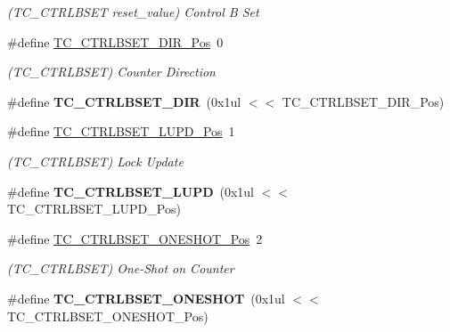 \begin{DoxyCompactItemize}
\begin{DoxyCompactList}\small\item\em (T\+C\+\_\+\+C\+T\+R\+L\+B\+S\+E\+T reset\+\_\+value) Control B Set \end{DoxyCompactList}\item 
\hypertarget{group___s_a_m_l21___t_c_gabf280d5e61422b23b9b6d8c07d33b079}{}\#define \hyperlink{group___s_a_m_l21___t_c_gabf280d5e61422b23b9b6d8c07d33b079}{T\+C\+\_\+\+C\+T\+R\+L\+B\+S\+E\+T\+\_\+\+D\+I\+R\+\_\+\+Pos}~0\label{group___s_a_m_l21___t_c_gabf280d5e61422b23b9b6d8c07d33b079}

\begin{DoxyCompactList}\small\item\em (T\+C\+\_\+\+C\+T\+R\+L\+B\+S\+E\+T) Counter Direction \end{DoxyCompactList}\item 
\hypertarget{group___s_a_m_l21___t_c_ga822478054eab6d1670c826214bc6317f}{}\#define {\bfseries T\+C\+\_\+\+C\+T\+R\+L\+B\+S\+E\+T\+\_\+\+D\+I\+R}~(0x1ul $<$$<$ T\+C\+\_\+\+C\+T\+R\+L\+B\+S\+E\+T\+\_\+\+D\+I\+R\+\_\+\+Pos)\label{group___s_a_m_l21___t_c_ga822478054eab6d1670c826214bc6317f}

\item 
\hypertarget{group___s_a_m_l21___t_c_ga4da73190935115dea69e74197e72aa0b}{}\#define \hyperlink{group___s_a_m_l21___t_c_ga4da73190935115dea69e74197e72aa0b}{T\+C\+\_\+\+C\+T\+R\+L\+B\+S\+E\+T\+\_\+\+L\+U\+P\+D\+\_\+\+Pos}~1\label{group___s_a_m_l21___t_c_ga4da73190935115dea69e74197e72aa0b}

\begin{DoxyCompactList}\small\item\em (T\+C\+\_\+\+C\+T\+R\+L\+B\+S\+E\+T) Lock Update \end{DoxyCompactList}\item 
\hypertarget{group___s_a_m_l21___t_c_gaeba2402a78e94d4354142a8bf8f3551e}{}\#define {\bfseries T\+C\+\_\+\+C\+T\+R\+L\+B\+S\+E\+T\+\_\+\+L\+U\+P\+D}~(0x1ul $<$$<$ T\+C\+\_\+\+C\+T\+R\+L\+B\+S\+E\+T\+\_\+\+L\+U\+P\+D\+\_\+\+Pos)\label{group___s_a_m_l21___t_c_gaeba2402a78e94d4354142a8bf8f3551e}

\item 
\hypertarget{group___s_a_m_l21___t_c_ga9b13673f722f1d508b8c0823b7309170}{}\#define \hyperlink{group___s_a_m_l21___t_c_ga9b13673f722f1d508b8c0823b7309170}{T\+C\+\_\+\+C\+T\+R\+L\+B\+S\+E\+T\+\_\+\+O\+N\+E\+S\+H\+O\+T\+\_\+\+Pos}~2\label{group___s_a_m_l21___t_c_ga9b13673f722f1d508b8c0823b7309170}

\begin{DoxyCompactList}\small\item\em (T\+C\+\_\+\+C\+T\+R\+L\+B\+S\+E\+T) One-\/\+Shot on Counter \end{DoxyCompactList}\item 
\hypertarget{group___s_a_m_l21___t_c_ga41a17334fbd87b37ffc4bd5bae3c952c}{}\#define {\bfseries T\+C\+\_\+\+C\+T\+R\+L\+B\+S\+E\+T\+\_\+\+O\+N\+E\+S\+H\+O\+T}~(0x1ul $<$$<$ T\+C\+\_\+\+C\+T\+R\+L\+B\+S\+E\+T\+\_\+\+O\+N\+E\+S\+H\+O\+T\+\_\+\+Pos)\label{group___s_a_m_l21___t_c_ga41a17334fbd87b37ffc4bd5bae3c952c}


\end{DoxyCompactItemize}
